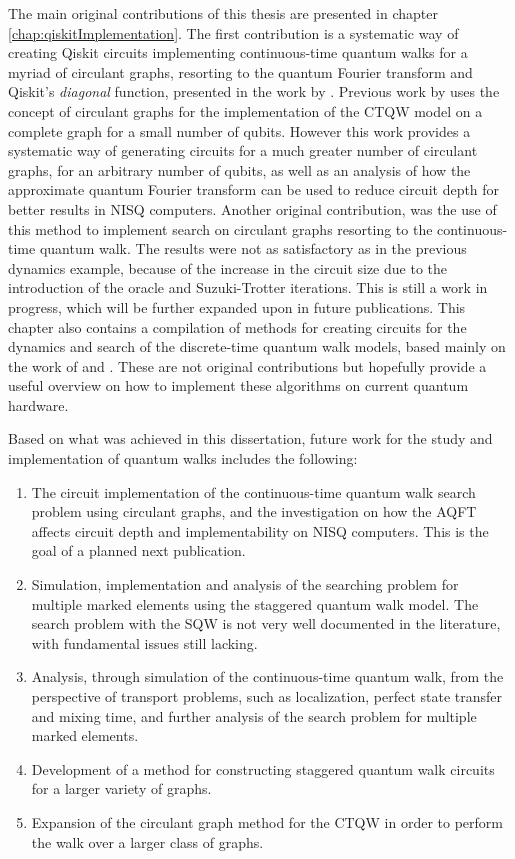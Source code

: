 \documentclass[../../dissertation.tex]{subfiles}
\begin{document}
The main original contributions of this thesis are presented in chapter
\ref{chap:qiskitImplementation}. The first contribution is a systematic way of creating Qiskit circuits implementing continuous-time quantum walks
for a myriad of circulant graphs, resorting to the quantum Fourier transform and
Qiskit's \textit{diagonal} function, presented in the work by \cite{chagassantos21}. Previous work by \cite{qiang2016} uses
the concept of circulant graphs for the implementation of the CTQW model on a
complete graph for a small number of qubits. However this work provides
a systematic way of generating circuits for a much greater number of circulant
graphs, for an arbitrary number of qubits, as well as an analysis of how the
approximate quantum Fourier transform can be used to reduce circuit depth for
better results in NISQ computers. 
Another original contribution, was the use of this method to implement search on circulant graphs
resorting to the continuous-time quantum walk. The results were not as satisfactory
as in the previous dynamics example, because of the increase in the circuit size due
to the introduction of the oracle and Suzuki-Trotter iterations. This is still
a work in progress, which will be further expanded upon in future publications.
This chapter also contains a compilation of methods for creating circuits for
the dynamics and search of the discrete-time quantum walk models, based mainly
on the work of \cite{douglaswang07} and \cite{acasiete2020}. These are not
original contributions but hopefully provide a useful overview on how to
implement these algorithms on current quantum hardware.\par

Based on what was achieved in this dissertation, future work for the study and
implementation of quantum walks includes the following:
\begin{enumerate}
	\item The circuit implementation of the continuous-time quantum walk search problem using circulant graphs, and the investigation on how the AQFT affects circuit depth and implementability on NISQ computers. This is the goal of a planned next publication.
	\item Simulation, implementation and analysis of the searching problem for multiple marked elements using the staggered quantum walk model. The search problem with the SQW is not very well documented in the literature, with fundamental issues still lacking.
	\item Analysis, through simulation of the continuous-time quantum walk, from the perspective of transport problems, such as localization, perfect state transfer and mixing time, and further analysis of the search problem for multiple marked elements.
	\item Development of a method for constructing staggered quantum walk circuits for a larger variety of graphs.
	\item Expansion of the circulant graph method for the CTQW in order to perform the walk over a larger class of graphs.
\end{enumerate}
\end{document}
